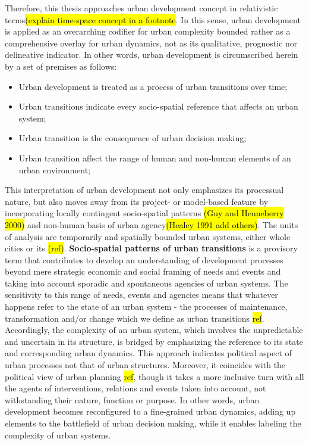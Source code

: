 \documentclass[11pt]{report}
\begin{document}
Therefore, this thesis approaches urban development concept in relativistic terms\hl{(explain time-space concept in a footnote}. In this sense, urban development is applied as an overarching codifier for urban complexity bounded rather as a comprehensive overlay for urban dynamics, not as its qualitative, prognostic nor delineative indicator. In other words,  urban development is circumscribed herein by a set of premises as follows: 
\begin{itemize}
\item Urban development is treated as a process of urban transitions over time;
\item Urban transitions indicate every socio-spatial reference that affects an urban system;
\item Urban transition is the consequence of urban decision making;
\item Urban transition affect the range of human and non-human elements of an urban environment;
\end {itemize}
This interpretation of urban development not only emphasizes its processual nature, but also moves away from its project- or model-based feature by incorporating locally contingent socio-spatial patterns \hl{(Guy and Henneberry 2000)} and non-human basis of urban agency\hl{(Healey 1991 add others)}. The units of analysis are temporarily and spatially bounded urban systems, either whole cities or its  \hl{(ref)}. \textbf{Socio-spatial patterns of urban transitions} is a provisory term  that contributes to develop an understanding of development processes beyond mere strategic economic and social framing of needs and events and taking into account sporadic and spontaneous agencies of urban systems. The sensitivity to this range of needs, events and agencies means that whatever happens refer to the state of an urban system - the processes of maintenance, transformation and/or change which we define as urban transitions \hl{ref}. Accordingly, the complexity of an urban system, which involves the unpredictable and uncertain in its structure, is bridged by emphasizing the reference to its state and corresponding urban dynamics. This approach indicates political aspect of urban processes not that of urban structures. Moreover, it coincides with the political view of urban planning \hl{ref}, though it takes a more inclusive turn with all the agents of interventions, relations and events taken into account, not withstanding their nature, function or purpose. In other words, urban development becomes reconfigured to a fine-grained urban dynamics, adding up elements to the battlefield of urban decision making, while it enables labeling the complexity of urban systems.
\end{document}
